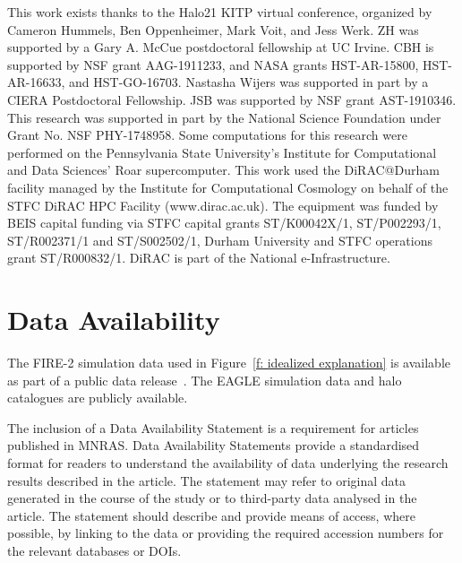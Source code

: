 \documentclass[fleqn,usenatbib]{mnras}
\begin{document}
This work exists thanks to the Halo21 KITP virtual conference, organized by Cameron Hummels, Ben Oppenheimer, Mark Voit, and Jess Werk.
ZH was supported by a Gary A. McCue postdoctoral fellowship at UC Irvine.
CBH is supported by NSF grant AAG-1911233, and NASA grants HST-AR-15800, HST-AR-16633, and HST-GO-16703.
Nastasha Wijers was supported in part by a CIERA Postdoctoral Fellowship.
JSB was supported by NSF grant AST-1910346.
This research was supported in part by the National Science Foundation under Grant No. NSF PHY-1748958.
Some computations for this research were performed on the Pennsylvania State University's Institute for Computational and Data Sciences' Roar supercomputer.
This work used the DiRAC@Durham facility managed by the Institute for Computational Cosmology on behalf of the STFC DiRAC HPC Facility (www.dirac.ac.uk). The equipment was funded by BEIS capital funding via STFC capital grants ST/K00042X/1, ST/P002293/1, ST/R002371/1 and ST/S002502/1, Durham University and STFC operations grant ST/R000832/1.
DiRAC is part of the National e-Infrastructure.

\section*{Data Availability}

The FIRE-2 simulation data used in Figure~\ref{f: idealized explanation} is available as part of a public data release~\citep{wetzel2022Public}.
The EAGLE simulation data \citep{EagleTeam2017} and halo catalogues \citep{McAlpine2016} are publicly available. 

The inclusion of a Data Availability Statement is a requirement for articles published in MNRAS. Data Availability Statements provide a standardised format for readers to understand the availability of data underlying the research results described in the article. The statement may refer to original data generated in the course of the study or to third-party data analysed in the article. The statement should describe and provide means of access, where possible, by linking to the data or providing the required accession numbers for the relevant databases or DOIs.




\end{document}
